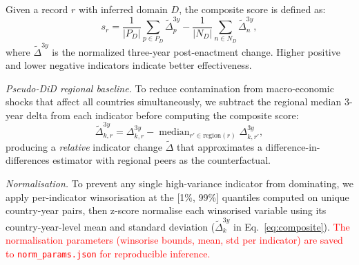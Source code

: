\documentclass[11pt]{article}
\begin{document}
Given a record $r$ with inferred domain $D$, the composite score is defined as:
\begin{equation}
s_r = \frac{1}{|P_D|}\sum_{p \in P_D} \tilde{\Delta}^{3y}_{p}
    - \frac{1}{|N_D|}\sum_{n \in N_D} \tilde{\Delta}^{3y}_{n},
\label{eq:composite}
\end{equation}
where $\tilde{\Delta}^{3y}$ is the normalized three-year post-enactment change. Higher positive and lower negative indicators indicate better effectiveness.

\begin{table}[!t]
\centering\small
\setlength{\tabcolsep}{3pt}
\caption{Domain-specific indicator groups used for composite outcome scoring.}
\label{tab:domain_inds}
\end{table}

\textit{Pseudo-DiD regional baseline.}
To reduce contamination from macro-economic shocks that affect all countries
simultaneously, we subtract the regional median
3-year delta from each indicator before computing the composite score:
\begin{equation}
\widetilde{\Delta}^{3y}_{k,r}
  = \Delta^{3y}_{k,r} - \operatorname{median}_{r'\in\text{region}(r)}\!\!\Delta^{3y}_{k,r'},
\label{eq:pseudo_did}
\end{equation}
producing a \emph{relative} indicator change $\widetilde{\Delta}$ that
approximates a difference-in-differences estimator with regional peers as
the counterfactual.

\textit{Normalisation.}
To prevent any single high-variance indicator from dominating, we apply
per-indicator winsorisation at the [1\%, 99\%] quantiles computed on unique
country-year pairs, then z-score normalise each winsorised variable using its
country-year-level mean and standard deviation ($\tilde{\Delta}^{3y}_{k}$ in
Eq.~\ref{eq:composite}).
\textcolor{red}{The normalisation parameters (winsorise bounds, mean, std per indicator) are
saved to \texttt{norm\_params.json} for reproducible inference.}
\end{document}
